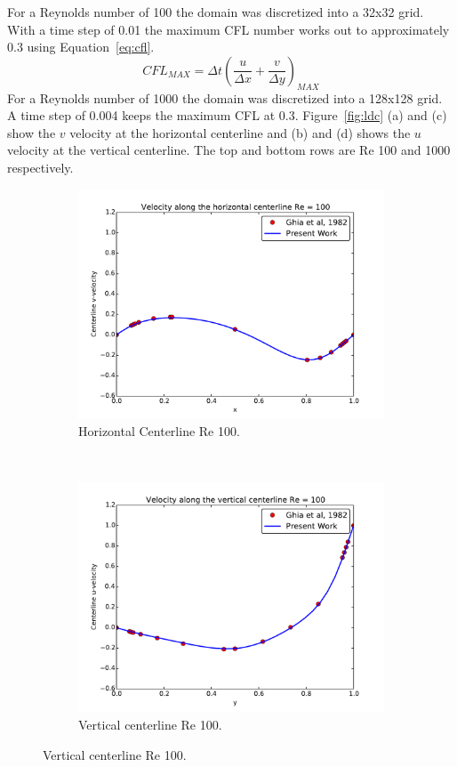 For a Reynolds number of 100 the domain was discretized into a 32x32 grid. 
With a time step of 0.01 the maximum CFL number works out to approximately 0.3 using Equation~\eqref{eq:cfl}.
\begin{equation}
CFL_{MAX}=\Delta t\left(\frac{u}{\Delta x}+\frac{v}{\Delta y}\right)_{MAX}
\label{eq:cfl}
\end{equation}
For a Reynolds number of 1000 the domain was discretized into a 128x128 grid. 
A time step of 0.004 keeps the maximum CFL at 0.3. 
Figure~\ref{fig:ldc} (a) and (c) show the $v$ velocity at the horizontal centerline and (b) and (d) shows the $u$ velocity at the vertical centerline.
The top and bottom rows are Re 100 and 1000 respectively. 
\begin{figure}[!htb]
	\centering
	\begin{subfigure}{0.4\textwidth}
		\includegraphics[width=\linewidth]{ldc_horizontal_100}
		\caption{Horizontal Centerline Re 100.}		
	\end{subfigure}
	~
	\begin{subfigure}{0.4\textwidth}
		\includegraphics[width=\linewidth]{ldc_vertical_100}
		\caption{Vertical centerline Re 100.}		
	\end{subfigure}
	

\end{figure}
